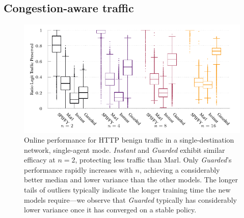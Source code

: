 \documentclass[10pt, times, comsoc]{IEEEtran}
\begin{document}
\subsection{Congestion-aware traffic}
%	
\begin{figure}
	\centering
	\cbstart
	\includegraphics[width=0.75\linewidth]{../plots/tnsm-tcp-box-single}
	\cbend
	\vspace{-0.3cm}
	\caption{
		Online performance for HTTP benign traffic in a single-destination network, single-agent mode.
		\emph{Instant} and \emph{Guarded} exhibit similar efficacy at $n=2$, protecting less traffic than Marl.
		Only \emph{Guarded}'s performance rapidly increases with $n$, achieving a considerably better median and lower variance than the other models.
		The longer tails of outliers typically indicate the longer training time the new models require---we observe that \emph{Guarded} typically has considerably lower variance once it has converged on a stable policy.
		\label{fig:tcp-tree-box}
	}
\vspace{-0.6cm}
\end{figure}
%	
\end{document}
